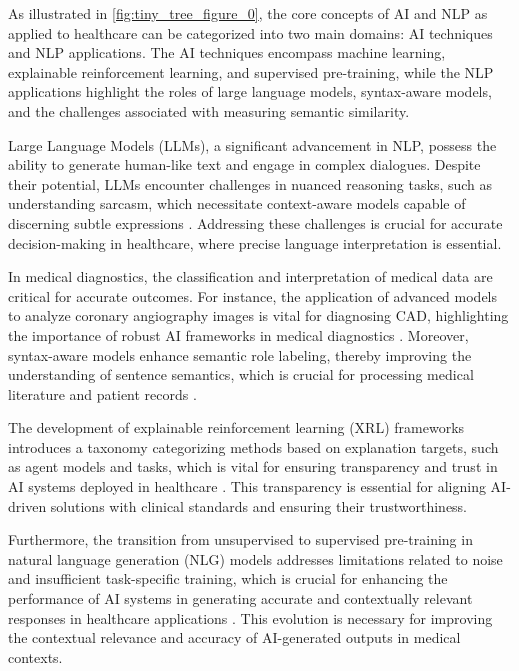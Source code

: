 As illustrated in \autoref{fig:tiny_tree_figure_0}, the core concepts of AI and NLP as applied to healthcare can be categorized into two main domains: AI techniques and NLP applications. The AI techniques encompass machine learning, explainable reinforcement learning, and supervised pre-training, while the NLP applications highlight the roles of large language models, syntax-aware models, and the challenges associated with measuring semantic similarity.

Large Language Models (LLMs), a significant advancement in NLP, possess the ability to generate human-like text and engage in complex dialogues. Despite their potential, LLMs encounter challenges in nuanced reasoning tasks, such as understanding sarcasm, which necessitate context-aware models capable of discerning subtle expressions \cite{nimase2024morecontextshelpsarcasm}. Addressing these challenges is crucial for accurate decision-making in healthcare, where precise language interpretation is essential.

In medical diagnostics, the classification and interpretation of medical data are critical for accurate outcomes. For instance, the application of advanced models to analyze coronary angiography images is vital for diagnosing CAD, highlighting the importance of robust AI frameworks in medical diagnostics \cite{pires2019multipledatasourceframework}. Moreover, syntax-aware models enhance semantic role labeling, thereby improving the understanding of sentence semantics, which is crucial for processing medical literature and patient records \cite{qian2017syntaxawarelstmmodel}.

The development of explainable reinforcement learning (XRL) frameworks introduces a taxonomy categorizing methods based on explanation targets, such as agent models and tasks, which is vital for ensuring transparency and trust in AI systems deployed in healthcare \cite{qing2023surveyexplainablereinforcementlearning}. This transparency is essential for aligning AI-driven solutions with clinical standards and ensuring their trustworthiness.

Furthermore, the transition from unsupervised to supervised pre-training in natural language generation (NLG) models addresses limitations related to noise and insufficient task-specific training, which is crucial for enhancing the performance of AI systems in generating accurate and contextually relevant responses in healthcare applications \cite{tang2023mvpmultitasksupervisedpretraining}. This evolution is necessary for improving the contextual relevance and accuracy of AI-generated outputs in medical contexts.

